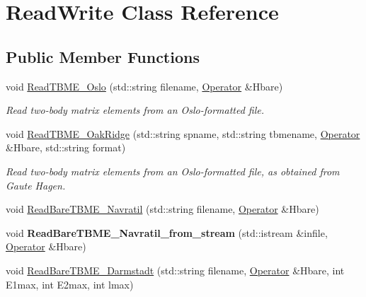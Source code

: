 \hypertarget{classReadWrite}{\section{Read\-Write Class Reference}
\label{classReadWrite}
}
\subsection*{Public Member Functions}
\begin{DoxyCompactItemize}
\item 
\hypertarget{classReadWrite_ae5561ab01c4fc1d3fae3ed155997d826}{void \hyperlink{classReadWrite_ae5561ab01c4fc1d3fae3ed155997d826}{Read\-T\-B\-M\-E\-\_\-\-Oslo} (std\-::string filename, \hyperlink{classOperator}{Operator} \&Hbare)}\label{classReadWrite_ae5561ab01c4fc1d3fae3ed155997d826}

\begin{DoxyCompactList}\small\item\em Read two-\/body matrix elements from an Oslo-\/formatted file. \end{DoxyCompactList}\item 
\hypertarget{classReadWrite_a2452263af0d93cb400047259c87950b8}{void \hyperlink{classReadWrite_a2452263af0d93cb400047259c87950b8}{Read\-T\-B\-M\-E\-\_\-\-Oak\-Ridge} (std\-::string spname, std\-::string tbmename, \hyperlink{classOperator}{Operator} \&Hbare, std\-::string format)}\label{classReadWrite_a2452263af0d93cb400047259c87950b8}

\begin{DoxyCompactList}\small\item\em Read two-\/body matrix elements from an Oslo-\/formatted file, as obtained from Gaute Hagen. \end{DoxyCompactList}\item 
void \hyperlink{classReadWrite_ac69ea7db65be10e8b63a3adf4cf6848d}{Read\-Bare\-T\-B\-M\-E\-\_\-\-Navratil} (std\-::string filename, \hyperlink{classOperator}{Operator} \&Hbare)
\item 
\hypertarget{classReadWrite_a258c666949b15835e379a1ed54a79e4a}{void {\bfseries Read\-Bare\-T\-B\-M\-E\-\_\-\-Navratil\-\_\-from\-\_\-stream} (std\-::istream \&infile, \hyperlink{classOperator}{Operator} \&Hbare)}\label{classReadWrite_a258c666949b15835e379a1ed54a79e4a}

\item 
\hypertarget{classReadWrite_a7b803218b2f6f06fb3702f820cda8314}{void \hyperlink{classReadWrite_a7b803218b2f6f06fb3702f820cda8314}{Read\-Bare\-T\-B\-M\-E\-\_\-\-Darmstadt} (std\-::string filename, \hyperlink{classOperator}{Operator} \&Hbare, int E1max, int E2max, int lmax)}\label{classReadWrite_a7b803218b2f6f06fb3702f820cda8314}


\end{DoxyCompactItemize}
